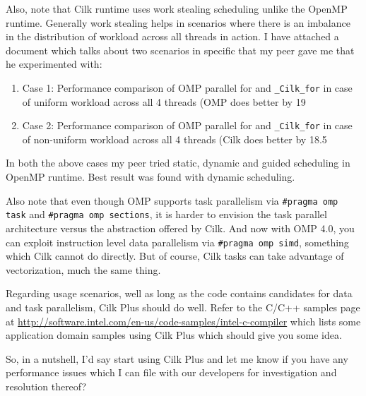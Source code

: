 \documentclass[12pt]{article}
\begin{document}
Also, note that Cilk runtime uses work stealing scheduling unlike the OpenMP runtime. Generally work stealing helps in scenarios where there is an imbalance in the distribution of workload across all threads in action. I have attached a document which talks about two scenarios in specific that my peer gave me that he experimented with:
\begin{enumerate}
\item
Case 1: Performance comparison of OMP parallel for and \verb+_Cilk_for+ in case of uniform workload across all 4 threads (OMP does better by 19%
\item 
Case 2: Performance comparison of OMP parallel for and \verb+_Cilk_for+ in case of non-uniform workload across all 4 threads (Cilk does better by 18.5%
\end{enumerate}
In both the above cases my peer tried static, dynamic and guided scheduling in OpenMP runtime. Best result was found with dynamic scheduling.
 
Also note that even though OMP supports task parallelism via 
\verb+#pragma omp task+ and 
\verb+#pragma omp sections+, it is harder to envision the task parallel architecture versus the abstraction offered by Cilk.  And now with OMP 4.0, you can exploit instruction level data parallelism via 
\verb+#pragma omp simd+, something which Cilk cannot do directly.  But of course, Cilk tasks can take advantage of vectorization, much the same thing.
 
Regarding usage scenarios, well as long as the code contains candidates for data and task parallelism, Cilk Plus should do well. Refer to the C/C++ samples page at \url{http://software.intel.com/en-us/code-samples/intel-c-compiler}  which lists some application domain samples using Cilk Plus which should give you some idea.
 
So, in a nutshell, I'd say start using Cilk Plus and let me know if you have any performance issues which I can file with our developers for investigation and resolution thereof?
\end{document}
